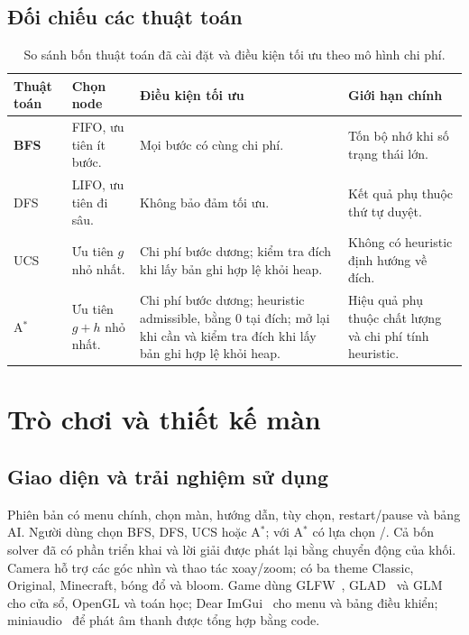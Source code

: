 \documentclass[a4paper]{article}
\newcommand{\tep}[1]{{\small\ttfamily\detokenize{#1}}}
\newcommand{\astar}{\texorpdfstring{A\ensuremath{^*}}{A*}}
\begin{document}
\subsection{Đối chiếu các thuật toán}
\begin{table}[H]
\centering
\small
\renewcommand{\arraystretch}{1.4}
\setlength{\tabcolsep}{6pt}

\begin{tabularx}{\textwidth}{
    |>{\raggedright\arraybackslash\bfseries}p{1.6cm}
    |>{\raggedright\arraybackslash}p{2.3cm}
    |>{\raggedright\arraybackslash}X
    |>{\raggedright\arraybackslash}X|
}
\hline
\rowcolor{blue!12}
Thuật toán &
\textbf{Chọn node} &
\textbf{Điều kiện tối ưu} &
\textbf{Giới hạn chính} \\
\hline

BFS &
FIFO, ưu tiên ít bước. &
Mọi bước có cùng chi phí. &
Tốn bộ nhớ khi số trạng thái lớn. \\
\hline

DFS &
LIFO, ưu tiên đi sâu. &
Không bảo đảm tối ưu. &
Kết quả phụ thuộc thứ tự duyệt. \\
\hline

UCS &
Ưu tiên $g$ nhỏ nhất. &
Chi phí bước dương; kiểm tra đích khi lấy
bản ghi hợp lệ khỏi heap. &
Không có heuristic định hướng về đích. \\
\hline

\astar{} &
Ưu tiên $g+h$ nhỏ nhất. &
Chi phí bước dương; heuristic admissible,
bằng 0 tại đích; mở lại khi cần và kiểm tra
đích khi lấy bản ghi hợp lệ khỏi heap. &
Hiệu quả phụ thuộc chất lượng
và chi phí tính heuristic. \\
\hline
\end{tabularx}

\caption{So sánh bốn thuật toán đã cài đặt và điều kiện tối ưu theo mô hình chi phí.}
\label{tab:so-sanh-thuat-toan}
\end{table}



\section{Trò chơi và thiết kế màn}
\subsection{Giao diện và trải nghiệm sử dụng}
Phiên bản có menu chính, chọn màn, hướng dẫn, tùy chọn, restart/pause và bảng AI. Người dùng chọn BFS, DFS, UCS hoặc \astar{}; với \astar{} có lựa chọn \tep{zero}/\tep{manhattan}. Cả bốn solver đã có phần triển khai và lời giải được phát lại bằng chuyển động của khối. Camera hỗ trợ các góc nhìn và thao tác xoay/zoom; có ba theme Classic, Original, Minecraft, bóng đổ và bloom. Game dùng GLFW~\cite{glfw}, GLAD~\cite{glad} và GLM~\cite{glm} cho cửa sổ, OpenGL và toán học; Dear ImGui~\cite{imgui} cho menu và bảng điều khiển; miniaudio~\cite{miniaudio} để phát âm thanh được tổng hợp bằng code.
\end{document}
